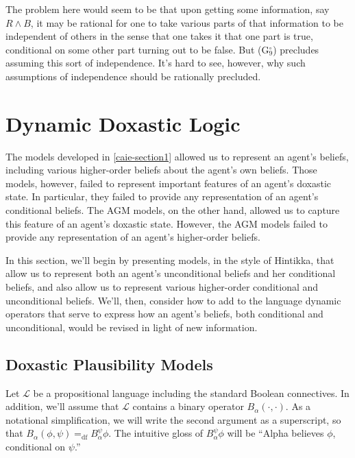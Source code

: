 The problem here would seem to be that upon getting some information, say $R \wedge B$, it may be rational for one to take various parts of that information to be independent of others in the sense that one takes it that one part is true, conditional on some other part turning out to be false.
But (G$^\circ_9$) precludes assuming this sort of independence.
It's hard to see, however, why such assumptions of independence should be rationally precluded.


\section{Dynamic Doxastic Logic}\label{caie-section3}

The models developed in \autoref{caie-section1} allowed us to represent an agent's beliefs, including various higher-order beliefs about the agent's own beliefs.
Those models, however, failed to represent important features of an agent's doxastic state.
In particular, they failed to provide any representation of an agent's conditional beliefs. 
The AGM models, on the other hand, allowed us to capture this feature of an agent's doxastic state.
However, the AGM models failed to provide any representation of an agent's higher-order beliefs.

In this section, we'll begin by presenting models, in the style of Hintikka, that allow us to represent both an agent's unconditional beliefs and her conditional beliefs, and also allow us to represent various higher-order conditional and unconditional beliefs.
We'll, then, consider how to add to the language dynamic operators that serve to express how an agent's beliefs, both conditional and unconditional, would be revised in light of new information.

\subsection{Doxastic Plausibility Models}\label{caie-section3-1}

Let $\mathcal{L}$ be a propositional language including the standard Boolean connectives.
In addition, we'll assume that $\mathcal{L}$ contains a binary operator $B_\alpha(\cdot, \cdot)$. 
As a notational simplification, we will write the second argument as a superscript, so that $B_\alpha(\phi, \psi) =_{\text{df}} B^\psi_\alpha \phi$.
The intuitive gloss of $B^\psi_\alpha \phi$ will be ``Alpha believes $\phi$, conditional on $\psi$.''

